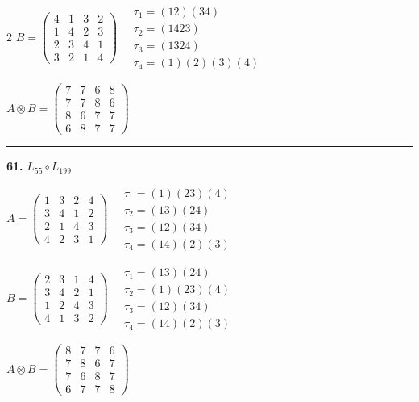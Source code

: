 \begin{multicols}{2}
$B = \begin{pmatrix} 4 & 1 & 3 & 2 \\ 1 & 4 & 2 & 3 \\ 2 & 3 & 4 & 1 \\ 3 & 2 & 1 & 4 \end{pmatrix} \quad \begin{matrix} \tau_{1}=(1 2)(3 4) \\ \tau_{2}=(1 4 2 3) \\ \tau_{3}=(1 3 2 4) \\ \tau_{4}=(1)(2)(3)(4) \end{matrix}$

$A \otimes B = \begin{pmatrix} 7 & 7 & 6 & 8 \\ 7 & 7 & 8 & 6 \\ 8 & 6 & 7 & 7 \\ 6 & 8 & 7 & 7 \end{pmatrix}$

\vspace{0.3em}
\hrule
\vspace{0.3em}

\noindent\textbf{61.} $L_{55} \circ L_{199}$

$A = \begin{pmatrix} 1 & 3 & 2 & 4 \\ 3 & 4 & 1 & 2 \\ 2 & 1 & 4 & 3 \\ 4 & 2 & 3 & 1 \end{pmatrix} \quad \begin{matrix} \tau_{1}=(1)(2 3)(4) \\ \tau_{2}=(1 3)(2 4) \\ \tau_{3}=(1 2)(3 4) \\ \tau_{4}=(1 4)(2)(3) \end{matrix}$

$B = \begin{pmatrix} 2 & 3 & 1 & 4 \\ 3 & 4 & 2 & 1 \\ 1 & 2 & 4 & 3 \\ 4 & 1 & 3 & 2 \end{pmatrix} \quad \begin{matrix} \tau_{1}=(1 3)(2 4) \\ \tau_{2}=(1)(2 3)(4) \\ \tau_{3}=(1 2)(3 4) \\ \tau_{4}=(1 4)(2)(3) \end{matrix}$

$A \otimes B = \begin{pmatrix} 8 & 7 & 7 & 6 \\ 7 & 8 & 6 & 7 \\ 7 & 6 & 8 & 7 \\ 6 & 7 & 7 & 8 \end{pmatrix}$


\end{multicols}

